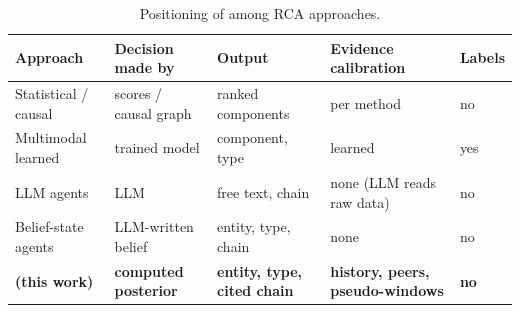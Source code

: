 \begin{table}[!htbp]
\centering
\caption{Positioning of \gama{} among RCA approaches.}\label{tab:positioning}
\small
\begin{tabularx}{\textwidth}{@{}l>{\raggedright\arraybackslash}X>{\raggedright\arraybackslash}X>{\raggedright\arraybackslash}X l@{}}
\toprule
Approach & Decision made by & Output & Evidence calibration & Labels \\
\midrule
Statistical / causal \citep{wu2020microrca,ikram2022rcd,pham2024baro} & scores / causal graph & ranked components & per method & no \\
Multimodal learned \citep{lee2023eadro,zhang2023diagfusion} & trained model & component, type & learned & yes \\
LLM agents \citep{wang2024rcagent,xu2025openrca,pei2025flowofaction} & LLM & free text, chain & none (LLM reads raw data) & no \\
Belief-state agents \citep{luo2026pos} & LLM-written belief & entity, type, chain & none & no \\
\textbf{\gama{} (this work)} & \textbf{computed posterior} & \textbf{entity, type, cited chain} & \textbf{history, peers, pseudo-windows} & \textbf{no} \\
\bottomrule
\end{tabularx}
\end{table}

